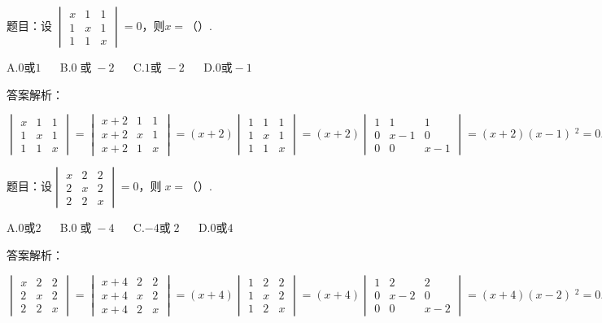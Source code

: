 题目：$设\;\begin{vmatrix}x&1&1\\1&x&1\\1&1&x\end{vmatrix}=0，则x=（）.$

A.$0或1$ $\quad$ B.$0\;或\;-2$ $\quad$ C.$1或\;-2$ $\quad$ D.$0或-1$

答案解析：

$\begin{vmatrix}x&1&1\\1&x&1\\1&1&x\end{vmatrix}=\begin{vmatrix}x+2&1&1\\x+2&x&1\\x+2&1&x\end{vmatrix}=\left(x+2\right)\begin{vmatrix}1&1&1\\1&x&1\\1&1&x\end{vmatrix}=\left(x+2\right)\begin{vmatrix}1&1&1\\0&x-1&0\\0&0&x-1\end{vmatrix}=\left(x+2\right)\left(x-1\right)\;^2=0.$



题目：$设\begin{vmatrix}x&2&2\\2&x&2\\2&2&x\end{vmatrix}=0，则\;x=（）.$

A.$0或2$ $\quad$ B.$0\;或\;-4$ $\quad$ C.$-4或\;2$ $\quad$ D.$0或4$

答案解析：

$\begin{vmatrix}x&2&2\\2&x&2\\2&2&x\end{vmatrix}=\begin{vmatrix}x+4&2&2\\x+4&x&2\\x+4&2&x\end{vmatrix}=\left(x+4\right)\begin{vmatrix}1&2&2\\1&x&2\\1&2&x\end{vmatrix}=\left(x+4\right)\begin{vmatrix}1&2&2\\0&x-2&0\\0&0&x-2\end{vmatrix}=\left(x+4\right)\left(x-2\right)\;^2=0.$



